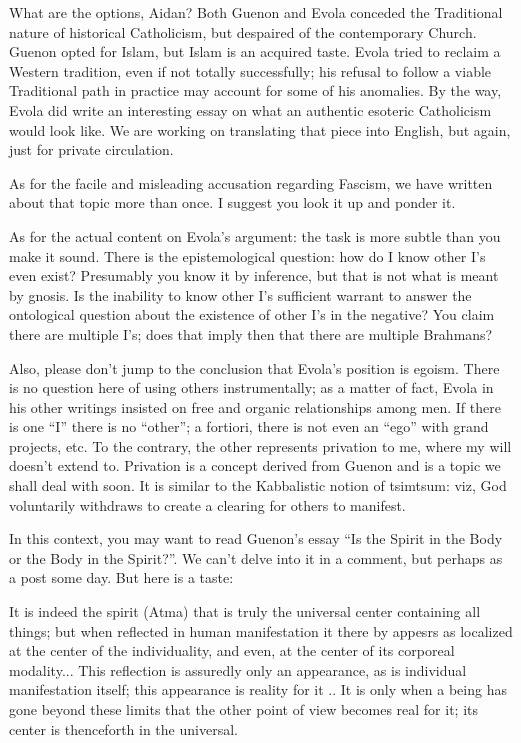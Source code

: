 \begin{footnotesize}
\begin{sffamily}
What are the options, Aidan? Both Guenon and Evola conceded the Traditional nature of historical Catholicism, but despaired of the contemporary Church. Guenon opted for Islam, but Islam is an acquired taste. Evola tried to reclaim a Western tradition, even if not totally successfully; his refusal to follow a viable Traditional path in practice may account for some of his anomalies. By the way, Evola did write an interesting essay on what an authentic esoteric Catholicism would look like. We are working on translating that piece into English, but again, just for private circulation.

As for the facile and misleading accusation regarding Fascism, we have written about that topic more than once. I suggest you look it up and ponder it.

As for the actual content on Evola's argument: the task is more subtle than you make it sound. There is the epistemological question: how do I know other I's even exist? Presumably you know it by inference, but that is not what is meant by gnosis. Is the inability to know other I's sufficient warrant to answer the ontological question about the existence of other I's in the negative? You claim there are multiple I's; does that imply then that there are multiple Brahmans?

Also, please don't jump to the conclusion that Evola's position is egoism. There is no question here of using others instrumentally; as a matter of fact, Evola in his other writings insisted on free and organic relationships among men. If there is one ``I'' there is no ``other''; a fortiori, there is not even an ``ego'' with grand projects, etc. To the contrary, the other represents privation to me, where my will doesn't extend to. Privation is a concept derived from Guenon and is a topic we shall deal with soon. It is similar to the Kabbalistic notion of tsimtsum: viz, God voluntarily withdraws to create a clearing for others to manifest.

In this context, you may want to read Guenon's essay ``Is the Spirit in the Body or the Body in the Spirit?''. We can't delve into it in a comment, but perhaps as a post some day. But here is a taste:

\begin{quotex}

It is indeed the spirit (Atma) that is truly the universal center containing all things; but when reflected in human manifestation it there by appesrs as localized at the center of the individuality, and even, at the center of its corporeal modality... This reflection is assuredly only an appearance, as is individual manifestation itself; this appearance is reality for it .. It is only when a being has gone beyond these limits that the other point of view becomes real for it; its center is thenceforth in the universal.
\end{quotex}



\end{sffamily}
\end{footnotesize}

